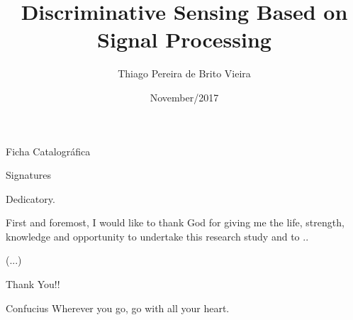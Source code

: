 \documentclass[en, oneside, onehalfspacing]{risethesis}
\title{Discriminative Sensing Based on Signal Processing}
\date{November/2017}
\author{Thiago Pereira de Brito Vieira}
\begin{document}
\frontmatter
\frontpage
\presentationpage

\begin{dedicatory}Ficha Catalográfica\end{dedicatory}

\begin{dedicatory}Signatures\end{dedicatory}

\begin{dedicatory}Dedicatory.\end{dedicatory}

\agradecimentos
First and foremost, I would like to thank God for giving me the life, strength, knowledge and opportunity to undertake this research study and to ..

(...)

Thank You!!

\begin{epigraph}[]{Confucius}
	Wherever you go, go with all your heart.
\end{epigraph}

\resumo


\abstract


\tableofcontents

\makeatletter
\renewcommand{\@thesubfigure}{\thesubfigure:\hskip\subfiglabelskip}
\makeatother
\setcounter{lofdepth}{2}

\listoffigures
\listoftables


\mainmatter







\appendix






\clearpage
\addappheadtotoc
\end{document}
